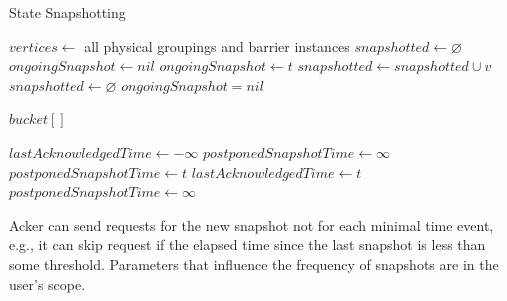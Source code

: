 \begin{algorithm}
\caption{State Snapshotting}
\label{state-snapshoting}
  \begin{algorithmic}
      \State $vertices \gets$ all physical groupings and barrier instances
      \State $snapshotted \gets \varnothing$
      \State $ongoingSnapshot \gets nil$
      \State
         
            \State {}
          \EndFor
          \State $ongoingSnapshot \gets t$
        \EndIf
      \EndEvent
        \State $snapshotted \gets snapshotted \cup v$
          \State {} 
          \State $snapshotted \gets \varnothing$
          \State $ongoingSnapshot = nil$
        \EndIf
      \EndEvent
    \EndProcess

      \State $bucket[]$ 
      \State
        \State {} 
        \State {}
        \State {}
      \EndEvent
    \EndProcess

      \State $lastAcknowledgedTime \gets -\infty$ 
      \State $postponedSnapshotTime \gets \infty$
      \State
          \State {}
        \Else
          \State $postponedSnapshotTime \gets t$
        \EndIf
      \EndEvent
        \State $lastAcknowledgedTime \gets t$
          \State {}
          \State $postponedSnapshotTime \gets \infty$
        \EndIf
      \EndEvent
    \EndProcess
  \end{algorithmic}
\end{algorithm}

Acker can send requests for the new snapshot not for each minimal time event, e.g., it can skip request if the elapsed time since the last snapshot is less than some threshold. Parameters that influence the frequency of snapshots are in the user's scope.

